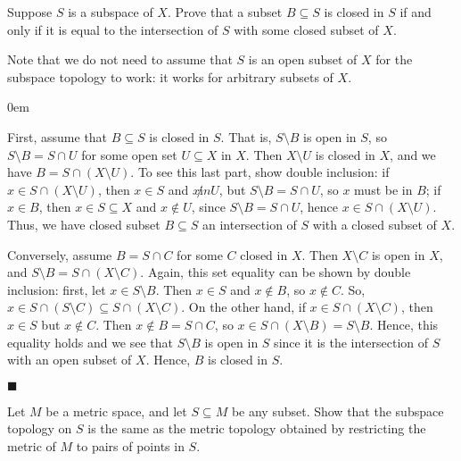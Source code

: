 \documentclass[12pt]{article}
\renewcommand{\qed}{\hfill$\blacksquare$}
\renewenvironment{proof}{\begin{addmargin}[1em]{0em}\begin{newproof}}{\end{newproof}\end{addmargin}\qed}
\newenvironment{exercise}[2][Exercise]{\begin{trivlist}
\item[\hskip \labelsep {\bfseries #1}\hskip \labelsep {\bfseries #2.}]}{\end{trivlist}}
\begin{document}
\begin{exercise}{3.2}
Suppose $S$ is a subspace of $X$. Prove that a subset $B\subseteq S$ is closed in $S$ if and only if it is equal to the intersection of $S$ with some closed subset of $X$.
\end{exercise}
{\color{red} Note that we do not need to assume that $S$ is an open subset of $X$ for the subspace topology to work: it works for arbitrary subsets of $X$.}\\
\begin{proof}
First, assume that $B\subseteq S$ is closed in $S$. That is, $S\setminus B$ is open in $S$, so $S\setminus B = S\cap U$ for some open set $U\subseteq X$ in $X$. Then $X\setminus U$ is closed in $X$, and we have $B=S\cap\left(X\setminus U\right)$. To see this last part, show double inclusion: if $x \in S\cap \left(X\setminus U\right)$, then $x \in S$ and $x \not in U$, but $S\setminus B = S\cap U$, so $x$ must be in $B$; if $x\in B$, then $x\in S \subseteq X$ and $x \notin U$, since $S\setminus B=S\cap U$, hence $x \in S\cap \left(X\setminus U\right)$. Thus, we have closed subset $B\subseteq S$ an intersection of $S$ with a closed subset of $X$.

Conversely, assume $B=S\cap C$ for some $C$ closed in $X$. Then $X\setminus C$ is open in $X$, and $S\setminus B = S\cap \left(X\setminus C\right)$. Again, this set equality can be shown by double inclusion: first, let $x\in S\setminus B$. Then $x\in S$ and $x \notin B$, so $x \notin C$. So, $x\in S\cap \left(S\setminus C\right) \subseteq S\cap \left(X\setminus C\right)$. On the other hand, if $x \in S\cap \left(X\setminus C\right)$, then $x\in S$ but $x \notin C$. Then $x \notin B=S\cap C$, so $x\in S\cap \left(X\setminus B\right) = S\setminus B$. Hence, this equality holds and we see that $S\setminus B$ is open in $S$ since it is the intersection of $S$ with an open subset of $X$. Hence, $B$ is closed in $S$.
\end{proof}


\begin{exercise}{3.3}
Let $M$ be a metric space, and let $S\subseteq M$ be any subset. Show that the subspace topology on $S$ is the same as the metric topology obtained by restricting the metric of $M$ to pairs of points in $S$.
\end{exercise}
\end{document}
